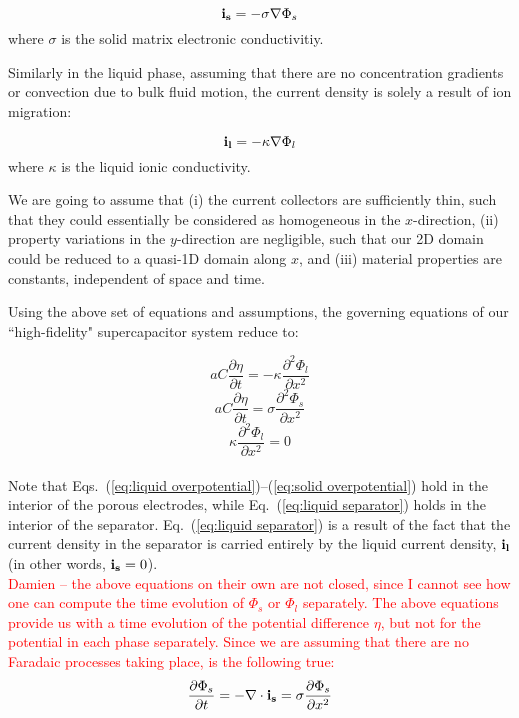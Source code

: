 \begin{equation}
\bold{i_s} = -\sigma \nabla \Phi_s
\label{eq:solid current}
\end{equation}
where $\sigma$ is the solid matrix electronic conductivitiy.

Similarly in the liquid phase, assuming that there are no concentration gradients or convection due to bulk fluid motion, the current density is solely a result of ion migration:

\begin{equation}
\bold{i_l} = -\kappa \nabla \Phi_l
\end{equation}  
where $\kappa$ is the liquid ionic conductivity.

We are going to assume that (i) the current collectors are sufficiently thin, such that they could essentially be considered as homogeneous in the $x$-direction, (ii) property variations in the $y$-direction are negligible, such that our 2D domain could be reduced to a quasi-1D domain along $x$, and (iii) material properties are constants, independent of space and time.

Using the above set of equations and assumptions, the governing equations of our ``high-fidelity" supercapacitor system reduce to:

\begin{equation}
aC \frac{\partial \eta}{\partial t} = - \kappa \frac{ \partial^2 \Phi_l}{\partial x^2} 
\label{eq:liquid overpotential} 
\end{equation}
\begin{equation}
aC \frac{\partial \eta}{\partial t} = \sigma \frac{ \partial^2 \Phi_s}{\partial x^2}  
\label{eq:solid overpotential} 
\end{equation}
\begin{equation}
\kappa \frac{ \partial^2 \Phi_l}{\partial x^2}  = 0 
\label{eq:liquid separator}
\end{equation}
\\
Note that Eqs.~(\ref{eq:liquid overpotential})--(\ref{eq:solid overpotential}) hold in the interior of the porous electrodes, while Eq.~(\ref{eq:liquid separator}) holds in the interior of the separator. Eq.~(\ref{eq:liquid separator}) is a result of the fact that the current density in the separator is carried entirely by the liquid current density, $\bold {i_l}$ (in other words, $\bold{i_s} = 0$).
\\
\textcolor{red}{Damien -- the above equations on their own are not closed, since I cannot see how one can compute the time evolution of $\Phi_s$ or $\Phi_l$ separately. The above equations provide us with a time evolution of the potential difference $\eta$, but not for the potential in each phase separately. 
Since we are assuming that there are no Faradaic processes taking place, is the following true:
$$ \frac{\partial \Phi_s}{\partial t} = - \nabla \cdot \bold{i_s} = \sigma \frac{\partial \Phi_s}{\partial x^2}$$
}
\\

